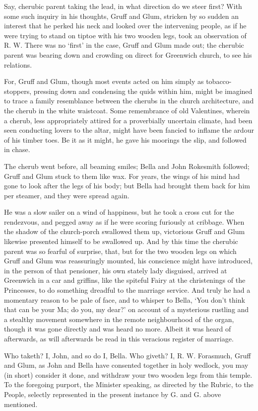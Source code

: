 Say, cherubic parent taking the lead, in what direction do we steer
first? With some such inquiry in his thoughts, Gruff and Glum, stricken
by so sudden an interest that he perked his neck and looked over the
intervening people, as if he were trying to stand on tiptoe with his two
wooden legs, took an observation of R. W. There was no ‘first’ in the
case, Gruff and Glum made out; the cherubic parent was bearing down and
crowding on direct for Greenwich church, to see his relations.

For, Gruff and Glum, though most events acted on him simply as
tobacco-stoppers, pressing down and condensing the quids within him,
might be imagined to trace a family resemblance between the cherubs in
the church architecture, and the cherub in the white waistcoat. Some
remembrance of old Valentines, wherein a cherub, less appropriately
attired for a proverbially uncertain climate, had been seen conducting
lovers to the altar, might have been fancied to inflame the ardour of
his timber toes. Be it as it might, he gave his moorings the slip, and
followed in chase.

The cherub went before, all beaming smiles; Bella and John Rokesmith
followed; Gruff and Glum stuck to them like wax. For years, the wings
of his mind had gone to look after the legs of his body; but Bella had
brought them back for him per steamer, and they were spread again.

He was a slow sailer on a wind of happiness, but he took a cross cut
for the rendezvous, and pegged away as if he were scoring furiously
at cribbage. When the shadow of the church-porch swallowed them up,
victorious Gruff and Glum likewise presented himself to be swallowed up.
And by this time the cherubic parent was so fearful of surprise, that,
but for the two wooden legs on which Gruff and Glum was reassuringly
mounted, his conscience might have introduced, in the person of that
pensioner, his own stately lady disguised, arrived at Greenwich in a
car and griffins, like the spiteful Fairy at the christenings of the
Princesses, to do something dreadful to the marriage service. And truly
he had a momentary reason to be pale of face, and to whisper to Bella,
‘You don’t think that can be your Ma; do you, my dear?’ on account of
a mysterious rustling and a stealthy movement somewhere in the remote
neighbourhood of the organ, though it was gone directly and was heard no
more. Albeit it was heard of afterwards, as will afterwards be read in
this veracious register of marriage.

Who taketh? I, John, and so do I, Bella. Who giveth? I, R. W. Forasmuch,
Gruff and Glum, as John and Bella have consented together in holy
wedlock, you may (in short) consider it done, and withdraw your two
wooden legs from this temple. To the foregoing purport, the Minister
speaking, as directed by the Rubric, to the People, selectly represented
in the present instance by G. and G. above mentioned.

